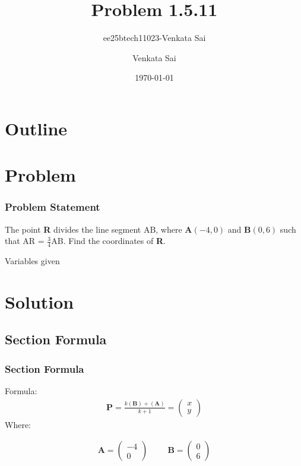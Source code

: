 \documentclass{beamer}
\title{Problem 1.5.11}
\author{ee25btech11023-Venkata Sai}
\author{Venkata Sai}
\date{\today}
\providecommand{\brak}[1]{\ensuremath{\left(#1\right)}}
\theoremstyle{remark}
\newcommand{\myvec}[1]{\ensuremath{\begin{pmatrix}#1\end{pmatrix}}}
\let\vec\mathbf
\numberwithin{equation}{section}
\begin{document}
\begin{frame}
\titlepage
\end{frame}

\section*{Outline}
\begin{frame}
\tableofcontents
\end{frame}
\section{Problem}
\begin{frame}
\frametitle{Problem Statement}
%
 The point \textbf{R} divides the line segment AB, where \textbf{A}$\brak{-4,0}$ and \textbf{B}$\brak{0,6}$ such that
AR = $\frac{3}{4}$AB. Find the coordinates of \textbf{R}. 
 \begin{table}[h!]    
  \centering
  
  \caption{Variables given}
  \label{tab 1.4.9.2}
\end{table}
\end{frame}

\section{Solution}
\subsection{Section Formula}
\begin{frame}
\frametitle{Section Formula}
Formula:
\begin{align}
\vec{P}=\frac{k(\vec{B})+(\vec{A})}{k+1}=\myvec{x\\y}
\end{align}
Where: 


\begin{align}
\vec{A}=\myvec{-4\\0} \hspace{1cm} \vec{B}=\myvec{0\\6} 
\end{align}


\end{frame}
\end{document}
